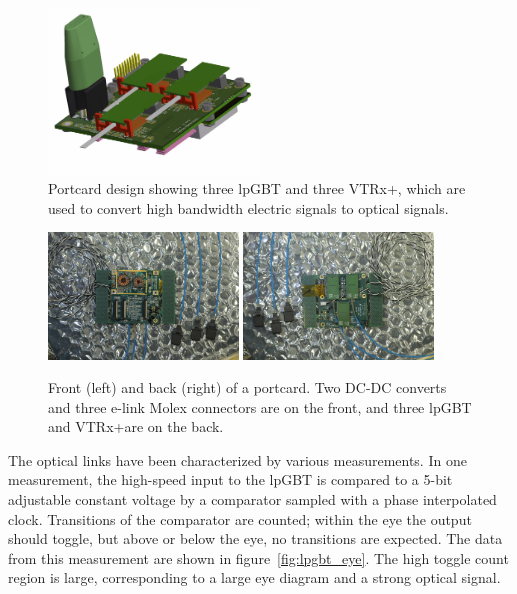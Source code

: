 \documentclass[a4paper,11pt]{article}
\newcommand{\vtrxp}{VTRx+}
\begin{document}
\begin{figure}[htbp]
\centering
\includegraphics[width=0.5\textwidth,origin=c]{../figures/port_card_design.png}
\caption{
\label{fig:port_card_design}
Portcard design showing three lpGBT and three \vtrxp, which are used to convert high bandwidth electric signals to optical signals.
}
\end{figure}

\begin{figure}[htbp]
\centering
\includegraphics[width=0.45\textwidth,origin=c]{../figures/port_card_front.jpeg}
\qquad
\includegraphics[width=0.45\textwidth,origin=c]{../figures/port_card_back.jpeg}
\caption{
\label{fig:port_card_pics}
Front (left) and back (right) of a portcard. Two DC-DC converts and three e-link Molex connectors are on the front, and three lpGBT and \vtrxp\space are on the back.
}
\end{figure}


The optical links have been characterized by various measurements.
In one measurement, the high-speed input to the lpGBT is compared to a 5-bit adjustable constant voltage by a comparator sampled with a phase interpolated clock.
Transitions of the comparator are counted; within the eye the output should toggle, but above or below the eye, no transitions are expected.
The data from this measurement are shown in figure~\ref{fig:lpgbt_eye}.
The high toggle count region is large, corresponding to a large eye diagram and a strong optical signal.
\end{document}
